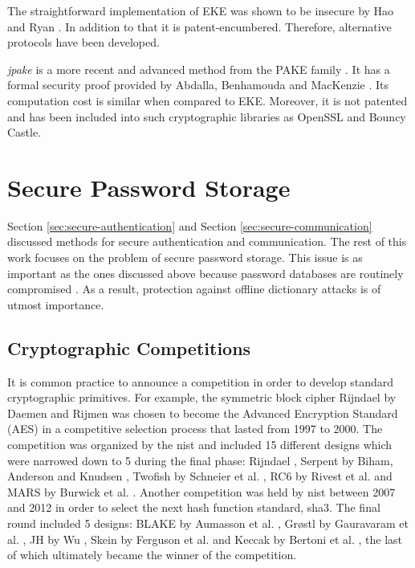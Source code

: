The straightforward implementation of EKE was shown to be insecure by Hao and Ryan \cite{hao2010j}. In addition to that it is patent-encumbered. Therefore, alternative protocols have been developed.

\emph{\gls{jpake}} is a more recent and advanced method from the PAKE family \cite{hao2010j}. It has a formal security proof provided by Abdalla, Benhamouda and MacKenzie \cite{abdalla2015security}. Its computation cost is similar when compared to EKE. Moreover, it is not patented and has been included into such cryptographic libraries as OpenSSL and Bouncy Castle.

\section{Secure Password Storage}
\label{sec:secure-password-storage}

Section \ref{sec:secure-authentication} and Section \ref{sec:secure-communication} discussed methods for secure authentication and communication. The rest of this work focuses on the problem of secure password storage. This issue is as important as the ones discussed above because password databases are routinely compromised \cite{dell:2010:password, bonneau:2012:the-science-of-guessing, ives:2004:domino}. As a result, protection against offline dictionary attacks is of utmost importance.

\subsection{Cryptographic Competitions}
\label{sec:cryptocomps}

It is common practice to announce a competition in order to develop standard cryptographic primitives. For example, the symmetric block cipher Rijndael by Daemen and Rijmen \cite{daemen:2002:DRA} was chosen to become the Advanced Encryption Standard (AES) \cite{aes-fips} in a competitive selection process \cite{nist:1997:aes-development, nist:2017:aes-development} that lasted from 1997 to 2000. The competition was organized by the \gls{nist} and included 15 different designs which were narrowed down to 5 during the final phase: Rijndael \cite{daemen:1998:rijndael}, Serpent by Biham, Anderson and Knudsen \cite{anderson:1998:serpent}, Twofish by Schneier et al. \cite{schneier:1998:twofish}, RC6 by Rivest et al. \cite{rivest:1998:rc6} and MARS by Burwick et al. \cite{burwick:1998:mars}. Another competition was held by \gls{nist} between 2007 and 2012 \cite{nist:2017:sha3-development} in order to select the next hash function standard, \gls{sha3}. The final round included 5 designs: BLAKE by Aumasson et al. \cite{aumasson:2011:blake-submission}, Grøstl by Gauravaram et al. \cite{praveen:2011:groestl-submission}, JH by Wu \cite{wu:2011:jh-submission}, Skein by Ferguson et al. \cite{ferguson:2011:skein-submission} and Keccak by Bertoni et al. \cite{bertoni:2011:keccak-submission}, the last of which ultimately became the winner of the competition.

